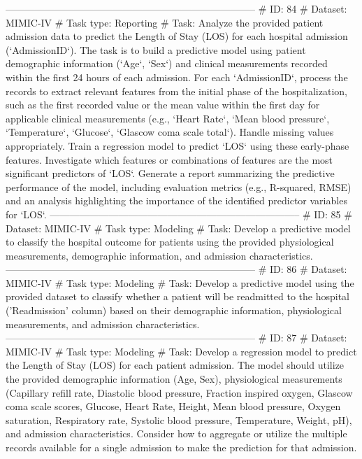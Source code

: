 \begin{tcolorbox}[colback=cadmiumgreen!5!white,colframe=forestgreen!75!white,breakable,title=\textit{Generated analytical tasks in task 4.}]
\begin{VerbatimWrap}
-----------------------------------------------------------------------------
# ID: 84  
# Dataset: MIMIC-IV 
# Task type: Reporting
# Task: Analyze the provided patient admission data to predict the Length of Stay (LOS) for each hospital admission (`AdmissionID`). The task is to build a predictive model using patient demographic information (`Age`, `Sex`) and clinical measurements recorded within the first 24 hours of each admission. For each `AdmissionID`, process the records to extract relevant features from the initial phase of the hospitalization, such as the first recorded value or the mean value within the first day for applicable clinical measurements (e.g., `Heart Rate`, `Mean blood pressure`, `Temperature`, `Glucose`, `Glascow coma scale total`). Handle missing values appropriately. Train a regression model to predict `LOS` using these early-phase features. Investigate which features or combinations of features are the most significant predictors of `LOS`. Generate a report summarizing the predictive performance of the model, including evaluation metrics (e.g., R-squared, RMSE) and an analysis highlighting the importance of the identified predictor variables for `LOS`.
-----------------------------------------------------------------------------
# ID: 85  
# Dataset: MIMIC-IV 
# Task type: Modeling
# Task: Develop a predictive model to classify the hospital outcome for patients using the provided physiological measurements, demographic information, and admission characteristics.
-----------------------------------------------------------------------------
# ID: 86  
# Dataset: MIMIC-IV 
# Task type: Modeling
# Task: Develop a predictive model using the provided dataset to classify whether a patient will be readmitted to the hospital ('Readmission' column) based on their demographic information, physiological measurements, and admission characteristics.
-----------------------------------------------------------------------------
# ID: 87  
# Dataset: MIMIC-IV 
# Task type: Modeling
# Task: Develop a regression model to predict the Length of Stay (LOS) for each patient admission. The model should utilize the provided demographic information (Age, Sex), physiological measurements (Capillary refill rate, Diastolic blood pressure, Fraction inspired oxygen, Glascow coma scale scores, Glucose, Heart Rate, Height, Mean blood pressure, Oxygen saturation, Respiratory rate, Systolic blood pressure, Temperature, Weight, pH), and admission characteristics. Consider how to aggregate or utilize the multiple records available for a single admission to make the prediction for that admission.

\end{VerbatimWrap}
\end{tcolorbox}
